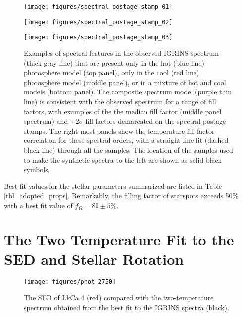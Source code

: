 \documentclass[twocolumn]{emulateapj}%
\begin{document}
\begin{figure*}
 \centering
 \texttt{[image: figures/spectral\_postage\_stamp\_01]} 

 \texttt{[image: figures/spectral\_postage\_stamp\_02]} 

 \texttt{[image: figures/spectral\_postage\_stamp\_03]} 
 \caption{Examples of spectral features in the observed IGRINS spectrum (thick gray line) that are present only in the hot (blue line) photosphere model (top panel), only in the cool (red line) photosphere model (middle panel), or in a mixture of hot and cool models (bottom panel).  The composite spectrum model (purple thin line) is consistent with the observed spectrum for a range of fill factors, with examples of the the median fill factor (middle panel spectrum) and $\pm2\sigma$ fill factors demarcated on the spectral postage stamps.  The right-most panels show the temperature-fill factor correlation for these spectral orders, with a straight-line fit (dashed black line) through all the samples.  The location of the samples used to make the synthetic spectra to the left are shown as solid black symbols.}
 \label{fig:specPostageStamp}
\end{figure*}

Best fit values for the stellar parameters summarized are listed in Table \ref{tbl_adopted_props}.  Remarkably, the filling factor of starspots exceeds 50\% with a best fit value of $f_{\Omega}=80\pm 5 \% $.




\section{The Two Temperature Fit to the SED and Stellar Rotation}\label{sec:GJHsection4}

\begin{figure}
 \centering
 \texttt{[image: figures/phot\_2750]}
\caption{The SED of LkCa 4 (red) compared with the two-temperature spectrum obtained from the best fit to the IGRINS spectra (black).}
\label{fig:sed}
\end{figure}
\end{document}
